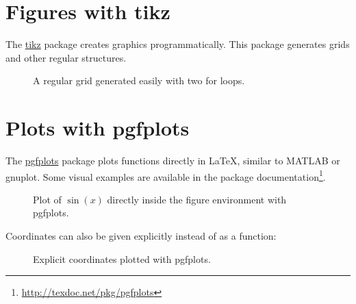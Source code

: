\documentclass[../thesis-example]{subfiles}
\begin{document}
\section{Figures with tikz}

The \href{https://ctan.org/pkg/pgf}{tikz} package creates graphics programmatically.
This package generates grids and other regular structures.

\begin{ltgexample}
\begin{figure}[ht]
  \centering
  \caption{A regular grid generated easily with two for loops.}\label{fig:tikz_example}
\end{figure}
\end{ltgexample}

\section{Plots with pgfplots}

The \href{https://ctan.org/pkg/pgfplots}{pgfplots} package plots functions directly in \LaTeX{}, similar to MATLAB or gnuplot.
Some visual examples are available in the package documentation\footnote{\url{http://texdoc.net/pkg/pgfplots}}.

\begin{ltgexample}
\begin{figure}[ht]
  \centering
  \caption{Plot of $\sin(x)$ directly inside the figure environment with pgfplots.}
  \label{fig:pgfplots_example}
\end{figure}
\end{ltgexample}

Coordinates can also be given explicitly instead of as a function:
\begin{ltgexample}
\begin{figure}[ht]
  \centering
  \caption{Explicit coordinates plotted with pgfplots.}
  \label{fig:pgfplots_coords}
\end{figure}
\end{ltgexample}
\end{document}
